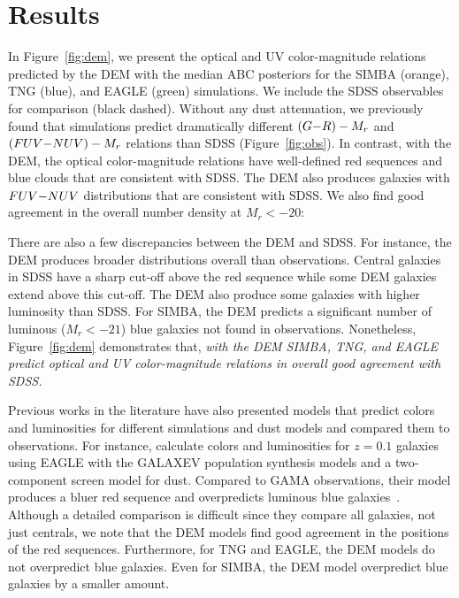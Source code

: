 \section{Results} \label{sec:results}
In Figure~\ref{fig:dem}, we present the optical and UV color-magnitude
relations predicted by the DEM with the median ABC posteriors for the SIMBA
(orange), TNG (blue), and EAGLE (green) simulations. We include the SDSS
observables for comparison (black dashed). Without any dust attenuation, we
previously found that simulations predict dramatically different $(G{-}R) - M_r$
and $(FUV{-}NUV) - M_r$ relations than SDSS (Figure~\ref{fig:obs}). In contrast,
with the DEM, the optical color-magnitude relations have well-defined red
sequences and blue clouds that are consistent with SDSS. The DEM also produces
galaxies with $FUV{-}NUV$ distributions that are consistent with SDSS. We
also find good agreement in the overall number density at $M_r < -20$:

There are also a few discrepancies between the DEM and SDSS. For instance, the
DEM produces broader distributions overall than observations. Central galaxies
in SDSS have a sharp cut-off above the red sequence while some DEM galaxies
extend above this cut-off. The DEM also produce some galaxies with higher
luminosity than SDSS. For SIMBA, the DEM predicts a significant number of
luminous ($M_r < -21$) blue galaxies not found in observations. Nonetheless, 
Figure~\ref{fig:dem} demonstrates that, \emph{with the DEM SIMBA, TNG, and EAGLE 
predict optical and UV color-magnitude relations in overall good agreement 
with SDSS.}

Previous works in the literature have also presented models that predict colors
and luminosities for different simulations and dust models and compared them to
observations. For instance, \cite{trayford2015} calculate colors and luminosities 
for $z=0.1$ galaxies using EAGLE with the {\sc GALAXEV} population synthesis models 
and a two-component screen model for dust. Compared to GAMA observations, their
model produces a bluer red sequence and overpredicts luminous blue galaxies~\citep[][Figure
5]{trayford2015}. Although a detailed comparison is difficult since they
compare all galaxies, not just centrals, we note that the DEM models find good
agreement in the positions of the red sequences. Furthermore, for TNG and EAGLE, 
the DEM models do not overpredict blue galaxies. Even for SIMBA, the DEM model
overpredict blue galaxies by a smaller amount.

